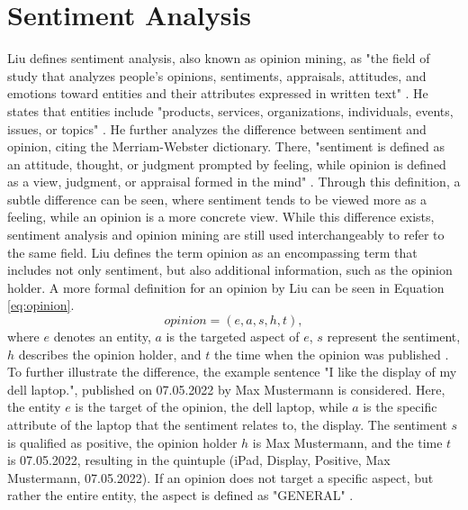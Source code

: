
\section{Sentiment Analysis}
Liu defines sentiment analysis, also known as opinion mining, as "the field of study that analyzes people's opinions, sentiments, appraisals, attitudes, and emotions toward entities and their attributes expressed in written text" \cite[p.~1]{liu_2015}. He states that entities include "products, services, organizations, individuals, events, issues, or topics" \cite[p.~1]{liu_2015}. He further analyzes the difference between sentiment and opinion, citing the Merriam-Webster dictionary. There, "sentiment is defined as an attitude, thought, or judgment prompted by feeling, while opinion is defined as a view, judgment, or appraisal formed in the mind" \cite[p.~2]{liu_2015}. Through this definition, a subtle difference can be seen, where sentiment tends to be viewed more as a feeling, while an opinion is a more concrete view. While this difference exists, sentiment analysis and opinion mining are still used interchangeably to refer to the same field. Liu defines the term opinion as an encompassing term that includes not only sentiment, but also additional information, such as the opinion holder. A more formal definition for an opinion by Liu can be seen in Equation \eqref{eq:opinion}.
\begin{equation}
    opinion = (e, a, s, h, t),
    \label{eq:opinion}
\end{equation}
where $e$ denotes an entity, $a$ is the targeted aspect of $e$, $s$ represent the sentiment, $h$ describes the opinion holder, and $t$ the time when the opinion was published \cite{liu_2015}. To further illustrate the difference, the example sentence "I like the display of my dell laptop.", published on 07.05.2022 by Max Mustermann is considered. Here, the entity $e$ is the target of the opinion, the dell laptop, while $a$ is the specific attribute of the laptop that the sentiment relates to, the display. The sentiment $s$ is qualified as positive, the opinion holder $h$ is Max Mustermann, and the time $t$ is 07.05.2022, resulting in the quintuple (iPad, Display, Positive, Max Mustermann, 07.05.2022). If an opinion does not target a specific aspect, but rather the entire entity, the aspect is defined as "GENERAL" \cite{liu_2015}. 


